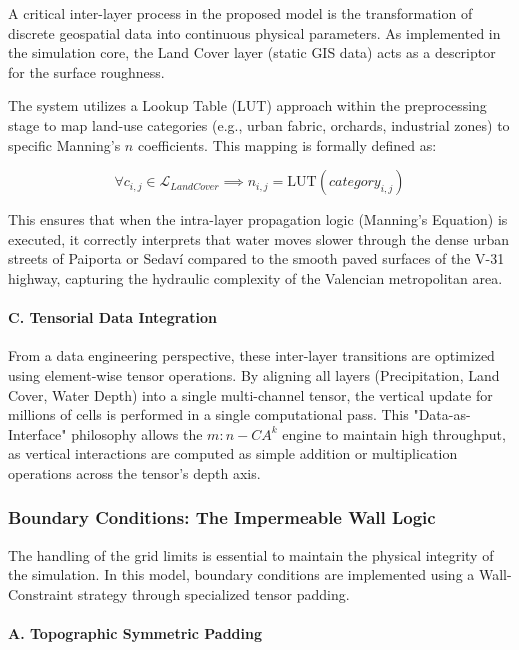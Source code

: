 A critical inter-layer process in the proposed model is the transformation of discrete geospatial data into continuous physical 
parameters. As implemented in the simulation core, the Land Cover layer (static GIS data) acts as a descriptor for the surface roughness.

The system utilizes a Lookup Table (LUT) approach within the preprocessing stage to map land-use categories (e.g., urban fabric, 
orchards, industrial zones) to specific Manning’s $n$ coefficients. This mapping is formally defined as:

$$\forall c_{i,j} \in \mathcal{L}_{LandCover} \implies n_{i,j} = \text{LUT}(category_{i,j})$$

This ensures that when the intra-layer propagation logic (Manning’s Equation) is executed, it correctly interprets that water moves 
slower through the dense urban streets of Paiporta or Sedaví compared to the smooth paved surfaces of the V-31 highway, capturing the 
hydraulic complexity of the Valencian metropolitan area.

\paragraph{C. Tensorial Data Integration}

From a data engineering perspective, these inter-layer transitions are optimized using element-wise tensor operations. By aligning all 
layers (Precipitation, Land Cover, Water Depth) into a single multi-channel tensor, the vertical update for millions of cells is 
performed in a single computational pass. This "Data-as-Interface" philosophy allows the $m:n-CA^k$ engine to maintain high throughput, 
as vertical interactions are computed as simple addition or multiplication operations across the tensor's depth axis.


\subsubsection{Boundary Conditions: The Impermeable Wall Logic}

The handling of the grid limits is essential to maintain the physical integrity of the simulation. In this model, boundary conditions 
are implemented using a Wall-Constraint strategy through specialized tensor padding.

\paragraph{A. Topographic Symmetric Padding}

